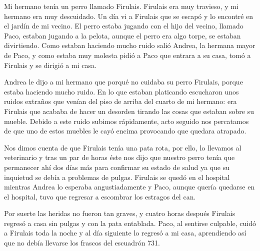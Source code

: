 \documentclass{article}
\begin{document}
Mi hermano tenía un perro llamado Firulais. Firulais era muy travieso, y mi hermano era muy descuidado. Un día vi a Firulais que se escapó y lo encontré en el jardín de mi vecino.
El perro estaba jugando con el hijo del vecino, llamado Paco, estaban jugando a la pelota, aunque el perro era algo torpe, se estaban divirtiendo. Como estaban haciendo mucho ruido salió Andrea, la hermana mayor de Paco, y como estaba muy molesta pidió a Paco que entrara a su casa, tomó a Firulais y se dirigió a mi casa.

Andrea le dijo a mi hermano que porqué no cuidaba su perro Firulais, porque estaba haciendo mucho ruido. En lo que estaban platicando escucharon unos ruidos extraños que venían del piso de arriba del cuarto de mi hermano: era Firulais que acababa de hacer un desorden tirando las cosas que estaban sobre su mueble. Debido a este ruido subimos rápidamente, acto seguido nos percatamos de que uno de estos muebles le cayó encima provocando que quedara atrapado.

Nos dimos cuenta de que Firulais tenía una pata rota, por ello, lo
llevamos al veterinario y tras un par de horas éste nos dijo que
nuestro perro tenía que permanecer ahí dos días más para confirmar su
estado de salud ya que su inquietud se debía a problemas de
pulgas. Firulais se quedó en el hospital mientras Andrea lo esperaba
angustiadamente y Paco, aunque quería quedarse en el hospital, tuvo
que regresar a escombrar los estragos del can. 


Por suerte las heridas no fueron tan graves, y cuatro horas después Firulais regresó a casa sin pulgas y con la pata
entablada. Paco, al sentirse culpable, cuidó a Firulais toda la noche y al día siguiente lo regresó a mi casa, aprendiendo así que no debía llevarse los frascos del escuadrón 731.  
\end{document}
